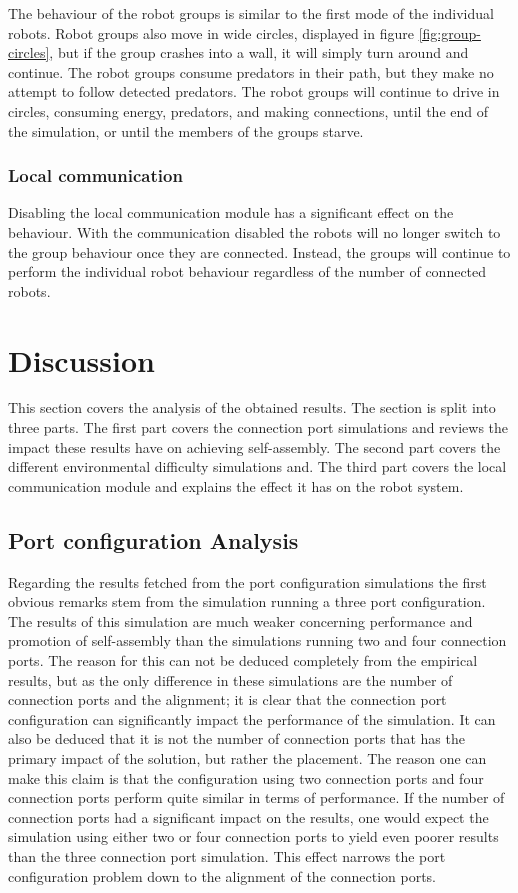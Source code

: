 The behaviour of the robot groups is similar to the first mode of the individual robots.
Robot groups also move in wide circles, displayed in figure \ref{fig:group-circles}, but if the group crashes into a wall, it will simply turn around and continue.
The robot groups consume predators in their path, but they make no attempt to follow detected predators.
The robot groups will continue to drive in circles, consuming energy, predators, and making connections, until the end of the simulation, or until the members of the groups starve.

\subsubsection{Local communication}
\label{sec:disable-local-communication}
Disabling the local communication module has a significant effect on the behaviour.
With the communication disabled the robots will no longer switch to the group behaviour once they are connected.
Instead, the groups will continue to perform the individual robot behaviour regardless of the number of connected robots.

\section{Discussion}
This section covers the analysis of the obtained results.
The section is split into three parts.
The first part covers the connection port simulations and reviews the impact these results have on achieving self-assembly.
The second part covers the different environmental difficulty simulations and.
The third part covers the local communication module and explains the effect it has on the robot system.

\subsection{Port configuration Analysis}
Regarding the results fetched from the port configuration simulations the first obvious remarks stem from the simulation running a three port configuration.
The results of this simulation are much weaker concerning performance and promotion of self-assembly than the simulations running two and four connection ports.
The reason for this can not be deduced completely from the empirical results, but as the only difference in these simulations are the number of connection ports and the alignment; it is clear that the connection port configuration can significantly impact the performance of the simulation.
It can also be deduced that it is not the number of connection ports that has the primary impact of the solution, but rather the placement.
The reason one can make this claim is that the configuration using two connection ports and four connection ports perform quite similar in terms of performance.
If the number of connection ports had a significant impact on the results, one would expect the simulation using either two or four connection ports to yield even poorer results than the three connection port simulation.
This effect narrows the port configuration problem down to the alignment of the connection ports.

